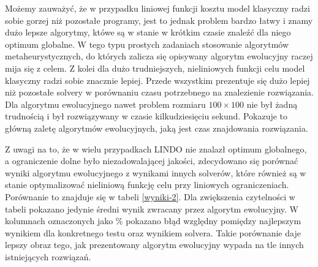 Możemy zauważyć, że w przypadku liniowej funkcji kosztu model klasyczny radzi sobie gorzej niż pozostałe programy, jest to jednak problem bardzo 
łatwy i znamy dużo lepsze algorytmy, któwe są w stanie w krótkim czasie znaleźć dla niego optimum globalne. W tego typu prostych zadaniach stosowanie 
algorytmów metaheurystycznych, do których zalicza się opisywany algorytm ewolucyjny raczej mija się z celem. Z kolei dla dużo trudniejszych, nieliniowych 
funkcji celu model klasyczny radzi sobie znacznie lepiej. Przede wszystkim prezentuje się dużo lepiej niż pozostałe solvery w porównaniu czasu 
potrzebnego na znalezienie rozwiązania. Dla algorytmu ewolucyjnego nawet problem rozmiaru $100 \times 100$ nie był żadną trudnością i 
był rozwiązywany w czasie kilkudziesięciu sekund. Pokazuje to główną zaletę algorytmów ewolucyjnych, jaką jest czas znajdowania rozwiązania.

Z uwagi na to, że w wielu przypadkach LINDO nie znalazł optimum globalnego, a ograniczenie dolne było niezadowalającej jakości, zdecydowano się 
porównać wyniki algorytmu ewolucyjnego z wynikami innych solverów, które również są w stanie optymalizować nieliniową funkcję celu 
przy liniowych ograniczeniach. Porównanie to znajduje się w tabeli \ref{wyniki-2}. Dla zwiększenia czytelności w tabeli pokazano jedynie średni wynik 
zwracany przez algorytm ewolucyjny. W kolumnach oznaczonych jako \% pokazano błąd względny pomiędzy najlepszym wynikiem dla konkretnego testu oraz 
wynikiem solvera. Takie porównanie daje lepszy obraz tego, jak prezentowany algorytm ewolucyjny wypada na tle innych istniejących rozwiązań.

